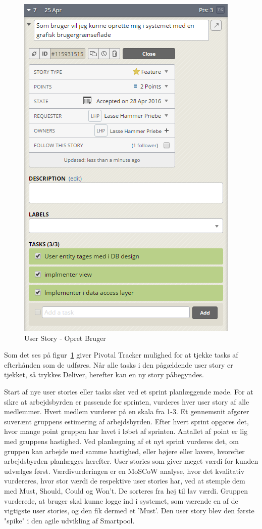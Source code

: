 \begin{figure}
	\centering
	\includegraphics[width=0.5\linewidth]{figs/processProjektGennemforsel/userstory_with_tasks.PNG}
	\caption{User Story - Opret Bruger}
	\label{fig:userstory_with_tasks}
\end{figure}

Som det ses på figur~\ref{fig:userstory_with_tasks} giver Pivotal Tracker mulighed for at tjekke tasks af efterhånden som de udføres. Når alle tasks i den pågældende user story er tjekket, så trykkes Deliver, herefter kan en ny story påbegyndes. 

Start af nye user stories eller tasks sker ved et sprint planlæggende møde. For at sikre at arbejdsbyrden er passende for sprinten, vurderes hver user story af alle medlemmer. Hvert medlem vurderer på en skala fra 1-3. Et gennemsnit afgører suverænt gruppens estimering af arbejdsbyrden. Efter hvert sprint opgøres det, hvor mange point gruppen har lavet i løbet af sprinten. Antallet af point er lig med gruppens hastighed. Ved planlægning af et nyt sprint vurderes det, om gruppen kan arbejde med samme hastighed, eller højere eller lavere, hvorefter arbejdsbyrden planlægges herefter. User stories som giver meget værdi for kunden udvælges først. Værdivurderingen er en MoSCoW analyse, hvor det kvalitativ vurdereres, hvor stor værdi de respektive user stories har, ved at stemple dem med Must, Should, Could og Won't. De sorteres fra høj til lav værdi. Gruppen vurderede, at bruger skal kunne logge ind i systemet, som værende en af de vigtigste user stories, og den fik dermed et 'Must'. Den user story blev den første "spike" i den agile udvikling af Smartpool.  

